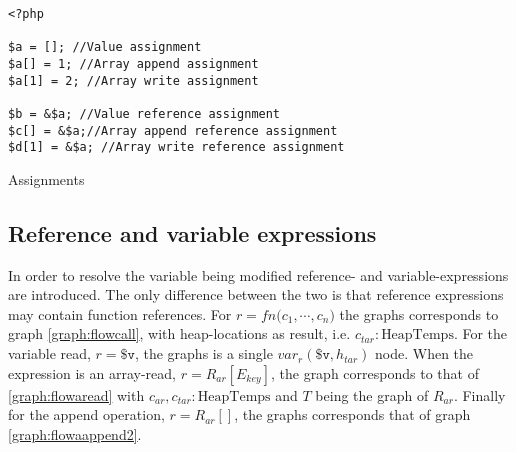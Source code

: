 \begin{graph}
{\begin{adjustbox}{max size={.24\textwidth}{.25\textheight}}
\begin{tikzpicture}[node distance = 2cm, auto]
\end{tikzpicture}\end{adjustbox}}\hfill%
\hspace*{\fill}
\end{graph}
\begin{program}
\begin{lstlisting}
<?php

$a = []; //Value assignment
$a[] = 1; //Array append assignment
$a[1] = 2; //Array write assignment

$b = &$a; //Value reference assignment
$c[] = &$a;//Array append reference assignment
$d[1] = &$a; //Array write reference assignment

\end{lstlisting}
\caption{Assignments}
\label{lst:assignments}
\end{program}

\subsection{Reference and variable expressions}
In order to resolve the variable being modified reference- and variable-expressions are introduced. The only difference between the two is that reference expressions may contain function references. For $r = \mathit{fn} \texttt{(}c_1, \cdots, c_n\texttt{)}$ the graphs corresponds to graph \ref{graph:flowcall}, with heap-locations as result, i.e. $c_{tar} : \text{HeapTemps}$. For the variable read, $r = \texttt{\$v}$, the graphs is a single $\mathit{var}_r(\texttt{\$v}, h_{tar})$ node. When the expression is an array-read, $r= R_{ar}[E_{key}]$, the graph corresponds to that of \ref{graph:flowaread} with $c_{ar},c_{tar} : \text{HeapTemps}$ and $T$ being the graph of $R_{ar}$. Finally for the append operation, $r = R_{ar}[]$, the graphs corresponds that of graph \ref{graph:flowaappend2}.

